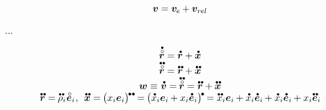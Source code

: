 \begin{otherlanguage}{russian}
\begin{equation}
\bm{v} = \bm{v}_{\hspace{-0.1ex}e} \hspace{-0.1ex} + \bm{v}_{r\kern-0.1exel}
\end{equation}

...

\begin{equation*}
\begin{array}{c}
\mathdotabove{\initiallocationvector} = \mathdotabove{\locationvector} + \mathdotabove{\bm{x}}
\\
\mathdotdotabove{\initiallocationvector} = \mathdotdotabove{\locationvector} + \mathdotdotabove{\bm{x}}
\\
\bm{w} \equiv \hspace{.1ex} \mathdotabove{\bm{v}} = \hspace{-0.15ex} \mathdotdotabove{\initiallocationvector} = \mathdotdotabove{\locationvector} + \mathdotdotabove{\bm{x}}
\\
\mathdotdotabove{\locationvector} = \hspace{-0.1ex}
\mathdotdotabove{\rho}_i \hspace{.1ex} \mathcircabove{\bm{e}}_i
\hspace{.1ex} , \:\:
\mathdotdotabove{\bm{x}} = \hspace{-0.15ex} \bigl( x_i \bm{e}_i \bigr)^{ \hspace{-0.15ex} \tikz[baseline=-0.2ex] \draw[black, fill=black] (0,0) circle (.28ex); \hspace{.2ex} \tikz[baseline=-0.2ex] \draw[black, fill=black] (0,0) circle (.28ex); } \hspace{-0.2ex}
= \hspace{-0.15ex} \bigl( \mathdotabove{x}_i \bm{e}_i \hspace{-0.1ex} + x_i \mathdotabove{\bm{e}}_i \bigr)^{ \hspace{-0.15ex} \tikz[baseline=-0.2ex] \draw[black, fill=black] (0,0) circle (.28ex); } \hspace{-0.15ex}
= \mathdotdotabove{x}_i \bm{e}_i \hspace{-0.1ex} + \mathdotabove{x}_i \mathdotabove{\bm{e}}_i \hspace{-0.1ex}
+ \mathdotabove{x}_i \mathdotabove{\bm{e}}_i \hspace{-0.1ex} + x_i \mathdotdotabove{\bm{e}}_i \hspace{-0.1ex}
\end{array}
\end{equation*}


\end{otherlanguage}
